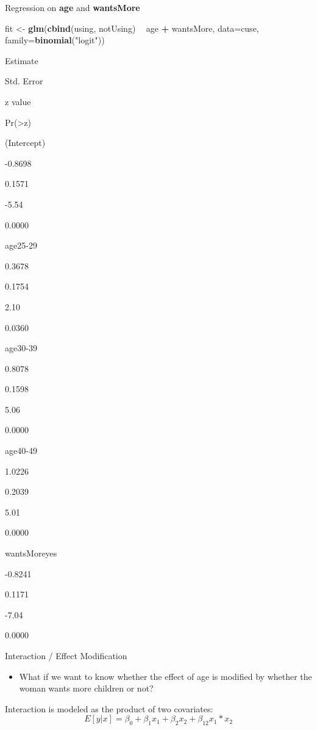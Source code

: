 \documentclass[
  ignorenonframetext,
]{beamer}
\newenvironment{Shaded}{\begin{snugshade}}{\end{snugshade}}
\newcommand{\DataTypeTok}[1]{\textcolor[rgb]{0.13,0.29,0.53}{#1}}
\newcommand{\KeywordTok}[1]{\textcolor[rgb]{0.13,0.29,0.53}{\textbf{#1}}}
\newcommand{\NormalTok}[1]{#1}
\newcommand{\OperatorTok}[1]{\textcolor[rgb]{0.81,0.36,0.00}{\textbf{#1}}}
\newcommand{\StringTok}[1]{\textcolor[rgb]{0.31,0.60,0.02}{#1}}
\providecommand{\tightlist}{%
  \setlength{\itemsep}{0pt}\setlength{\parskip}{0pt}}
\begin{document}
\begin{frame}[fragile]{Regression on \textbf{age} and
\textbf{wantsMore}}
\protect\hypertarget{regression-on-age-and-wantsmore}{}

\begin{Shaded}
\begin{Highlighting}[]
\NormalTok{fit <-}\StringTok{ }\KeywordTok{glm}\NormalTok{(}\KeywordTok{cbind}\NormalTok{(using, notUsing) }\OperatorTok{~}\StringTok{ }\NormalTok{age }\OperatorTok{+}\StringTok{ }\NormalTok{wantsMore, }
           \DataTypeTok{data=}\NormalTok{cuse, }\DataTypeTok{family=}\KeywordTok{binomial}\NormalTok{(}\StringTok{"logit"}\NormalTok{))}
\end{Highlighting}
\end{Shaded}

Estimate

Std. Error

z value

Pr(\textgreater\textbar z\textbar)

(Intercept)

-0.8698

0.1571

-5.54

0.0000

age25-29

0.3678

0.1754

2.10

0.0360

age30-39

0.8078

0.1598

5.06

0.0000

age40-49

1.0226

0.2039

5.01

0.0000

wantsMoreyes

-0.8241

0.1171

-7.04

0.0000

\end{frame}

\begin{frame}{Interaction / Effect Modification}
\protect\hypertarget{interaction-effect-modification}{}

\begin{itemize}
\tightlist
\item
  What if we want to know whether the effect of age is modified by
  whether the woman wants more children or not?
\end{itemize}

Interaction is modeled as the product of two covariates: \[
E[y|x] = \beta_0 + \beta_1 x_1 + \beta_2 x_2 + \beta_{12} x_1*x_2
\]

\end{frame}
\end{document}
